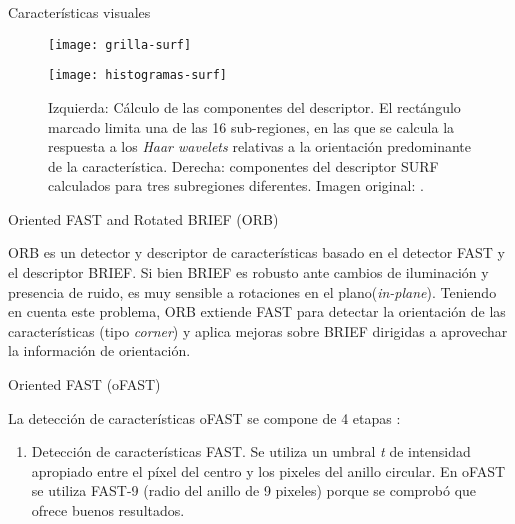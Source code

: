\begin{section}{Características visuales}
\begin{subsection}
\begin{subsection}
\begin{figure}[ht]
\centering
\begin{minipage}[h]{.45\textwidth}
\begin{center}
\texttt{[image: grilla-surf]}
\end{center}
\end{minipage}
\hfill
\begin{minipage}[h]{.45\textwidth}
\begin{center}
\texttt{[image: histogramas-surf]}
\end{center}
\end{minipage}
\hfill
\caption[Componentes del descriptor SURF]
{Izquierda: Cálculo de las componentes del descriptor. El rectángulo marcado limita una de las 16 sub-regiones, en las que se calcula la respuesta a los \textit{Haar wavelets} relativas a la orientación predominante de la característica. Derecha: componentes del descriptor SURF calculados para tres subregiones diferentes. Imagen original: \cite{bay2008speeded}.}
\label{fig:componentes-descriptor-surf}
\end{figure}

\end{subsection}

\end{subsection}

\begin{subsection}
{Oriented FAST and Rotated BRIEF (ORB)}

ORB\cite{RubleeRKB11} es un detector y descriptor de características basado en el detector FAST\cite{Rosten06machinelearning} y el descriptor BRIEF\cite{Calonder12}. Si bien BRIEF es robusto ante cambios de iluminación y presencia de ruido, es muy sensible a rotaciones en el plano(\textit{in-plane}). Teniendo en cuenta este problema, ORB extiende FAST para detectar la orientación de las características (tipo \textit{corner}) y aplica mejoras sobre BRIEF dirigidas a aprovechar la información de orientación.

\begin{subsection}
{Oriented FAST (oFAST)}

La detección de características oFAST se compone de 4 etapas :
\begin{enumerate}

\item Detección de características FAST. Se utiliza un umbral \textsl{t} de intensidad apropiado entre el píxel del centro y los pixeles del anillo circular. En oFAST se utiliza FAST-9 (radio del anillo de 9 pixeles) porque se comprobó que ofrece buenos resultados.


\end{enumerate}
\end{subsection}
\end{subsection}
\end{section}
